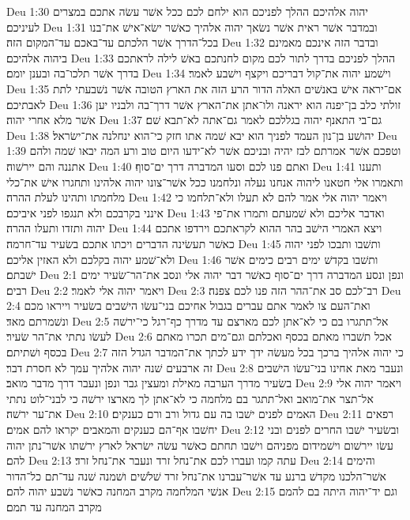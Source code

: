 Deu 1:30  יהוה אלהיכם ההלך לפניכם הוא ילחם לכם ככל אשׁר עשׂה אתכם במצרים לעיניכם׃
Deu 1:31  ובמדבר אשׁר ראית אשׁר נשׂאך יהוה אלהיך כאשׁר ישׂא־אישׁ את־בנו בכל־הדרך אשׁר הלכתם עד־באכם עד־המקום הזה׃
Deu 1:32  ובדבר הזה אינכם מאמינם ביהוה אלהיכם׃
Deu 1:33  ההלך לפניכם בדרך לתור לכם מקום לחנתכם באשׁ לילה לראתכם בדרך אשׁר תלכו־בה ובענן יומם׃
Deu 1:34  וישׁמע יהוה את־קול דבריכם ויקצף וישׁבע לאמר׃
Deu 1:35  אם־יראה אישׁ באנשׁים האלה הדור הרע הזה את הארץ הטובה אשׁר נשׁבעתי לתת לאבתיכם׃
Deu 1:36  זולתי כלב בן־יפנה הוא יראנה ולו־אתן את־הארץ אשׁר דרך־בה ולבניו יען אשׁר מלא אחרי יהוה׃
Deu 1:37  גם־בי התאנף יהוה בגללכם לאמר גם־אתה לא־תבא שׁם׃
Deu 1:38  יהושׁע בן־נון העמד לפניך הוא יבא שׁמה אתו חזק כי־הוא ינחלנה את־ישׂראל׃
Deu 1:39  וטפכם אשׁר אמרתם לבז יהיה ובניכם אשׁר לא־ידעו היום טוב ורע המה יבאו שׁמה ולהם אתננה והם יירשׁוה׃
Deu 1:40  ואתם פנו לכם וסעו המדברה דרך ים־סוף׃
Deu 1:41  ותענו ותאמרו אלי חטאנו ליהוה אנחנו נעלה ונלחמנו ככל אשׁר־צונו יהוה אלהינו ותחגרו אישׁ את־כלי מלחמתו ותהינו לעלת ההרה׃
Deu 1:42  ויאמר יהוה אלי אמר להם לא תעלו ולא־תלחמו כי אינני בקרבכם ולא תנגפו לפני איביכם׃
Deu 1:43  ואדבר אליכם ולא שׁמעתם ותמרו את־פי יהוה ותזדו ותעלו ההרה׃
Deu 1:44  ויצא האמרי הישׁב בהר ההוא לקראתכם וירדפו אתכם כאשׁר תעשׂינה הדברים ויכתו אתכם בשׂעיר עד־חרמה׃
Deu 1:45  ותשׁבו ותבכו לפני יהוה ולא־שׁמע יהוה בקלכם ולא האזין אליכם׃
Deu 1:46  ותשׁבו בקדשׁ ימים רבים כימים אשׁר ישׁבתם׃
Deu 2:1  ונפן ונסע המדברה דרך ים־סוף כאשׁר דבר יהוה אלי ונסב את־הר־שׂעיר ימים רבים׃
Deu 2:2  ויאמר יהוה אלי לאמר׃
Deu 2:3  רב־לכם סב את־ההר הזה פנו לכם צפנה׃
Deu 2:4  ואת־העם צו לאמר אתם עברים בגבול אחיכם בני־עשׂו הישׁבים בשׂעיר וייראו מכם ונשׁמרתם מאד׃
Deu 2:5  אל־תתגרו בם כי לא־אתן לכם מארצם עד מדרך כף־רגל כי־ירשׁה לעשׂו נתתי את־הר שׂעיר׃
Deu 2:6  אכל תשׁברו מאתם בכסף ואכלתם וגם־מים תכרו מאתם בכסף ושׁתיתם׃
Deu 2:7  כי יהוה אלהיך ברכך בכל מעשׂה ידך ידע לכתך את־המדבר הגדל הזה זה ארבעים שׁנה יהוה אלהיך עמך לא חסרת דבר׃
Deu 2:8  ונעבר מאת אחינו בני־עשׂו הישׁבים בשׂעיר מדרך הערבה מאילת ומעצין גבר ונפן ונעבר דרך מדבר מואב׃
Deu 2:9  ויאמר יהוה אלי אל־תצר את־מואב ואל־תתגר בם מלחמה כי לא־אתן לך מארצו ירשׁה כי לבני־לוט נתתי את־ער ירשׁה׃
Deu 2:10  האמים לפנים ישׁבו בה עם גדול ורב ורם כענקים׃
Deu 2:11  רפאים יחשׁבו אף־הם כענקים והמאבים יקראו להם אמים׃
Deu 2:12  ובשׂעיר ישׁבו החרים לפנים ובני עשׂו יירשׁום וישׁמידום מפניהם וישׁבו תחתם כאשׁר עשׂה ישׂראל לארץ ירשׁתו אשׁר־נתן יהוה להם׃
Deu 2:13  עתה קמו ועברו לכם את־נחל זרד ונעבר את־נחל זרד׃
Deu 2:14  והימים אשׁר־הלכנו מקדשׁ ברנע עד אשׁר־עברנו את־נחל זרד שׁלשׁים ושׁמנה שׁנה עד־תם כל־הדור אנשׁי המלחמה מקרב המחנה כאשׁר נשׁבע יהוה להם׃
Deu 2:15  וגם יד־יהוה היתה בם להמם מקרב המחנה עד תמם׃
